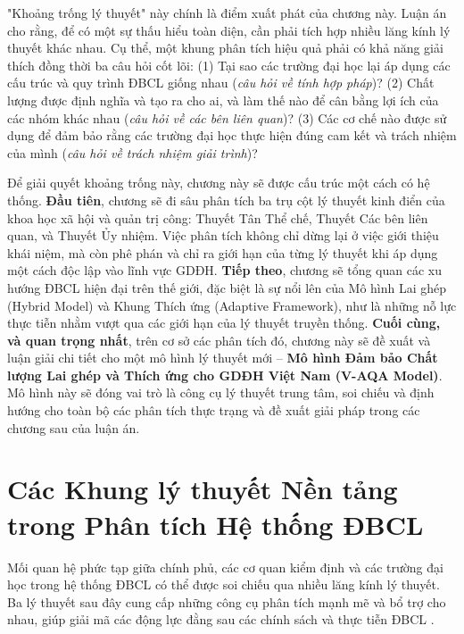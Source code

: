 \documentclass[12pt, a4paper, openany]{report}
\begin{document}
"Khoảng trống lý thuyết" này chính là điểm xuất phát của chương này. Luận án cho rằng, để có một sự thấu hiểu toàn diện, cần phải tích hợp nhiều lăng kính lý thuyết khác nhau. Cụ thể, một khung phân tích hiệu quả phải có khả năng giải thích đồng thời ba câu hỏi cốt lõi: (1) Tại sao các trường đại học lại áp dụng các cấu trúc và quy trình ĐBCL giống nhau (\textit{câu hỏi về tính hợp pháp})? (2) Chất lượng được định nghĩa và tạo ra cho ai, và làm thế nào để cân bằng lợi ích của các nhóm khác nhau (\textit{câu hỏi về các bên liên quan})? (3) Các cơ chế nào được sử dụng để đảm bảo rằng các trường đại học thực hiện đúng cam kết và trách nhiệm của mình (\textit{câu hỏi về trách nhiệm giải trình})?

Để giải quyết khoảng trống này, chương này sẽ được cấu trúc một cách có hệ thống. \textbf{Đầu tiên}, chương sẽ đi sâu phân tích ba trụ cột lý thuyết kinh điển của khoa học xã hội và quản trị công: Thuyết Tân Thể chế, Thuyết Các bên liên quan, và Thuyết Ủy nhiệm. Việc phân tích không chỉ dừng lại ở việc giới thiệu khái niệm, mà còn phê phán và chỉ ra giới hạn của từng lý thuyết khi áp dụng một cách độc lập vào lĩnh vực GDĐH. \textbf{Tiếp theo}, chương sẽ tổng quan các xu hướng ĐBCL hiện đại trên thế giới, đặc biệt là sự nổi lên của Mô hình Lai ghép (Hybrid Model) và Khung Thích ứng (Adaptive Framework), như là những nỗ lực thực tiễn nhằm vượt qua các giới hạn của lý thuyết truyền thống. \textbf{Cuối cùng, và quan trọng nhất}, trên cơ sở các phân tích đó, chương này sẽ đề xuất và luận giải chi tiết cho một mô hình lý thuyết mới – \textbf{Mô hình Đảm bảo Chất lượng Lai ghép và Thích ứng cho GDĐH Việt Nam (V-AQA Model)}. Mô hình này sẽ đóng vai trò là công cụ lý thuyết trung tâm, soi chiếu và định hướng cho toàn bộ các phân tích thực trạng và đề xuất giải pháp trong các chương sau của luận án.

\section{Các Khung lý thuyết Nền tảng trong Phân tích Hệ thống ĐBCL}
\label{sec:khung_ly_thuyet_nen_tang}

Mối quan hệ phức tạp giữa chính phủ, các cơ quan kiểm định và các trường đại học trong hệ thống ĐBCL có thể được soi chiếu qua nhiều lăng kính lý thuyết. Ba lý thuyết sau đây cung cấp những công cụ phân tích mạnh mẽ và bổ trợ cho nhau, giúp giải mã các động lực đằng sau các chính sách và thực tiễn ĐBCL \cite{OxfordResearch, GovernanceTheories, SAGE_HE}.
\end{document}
